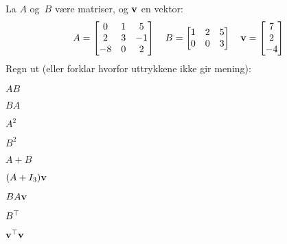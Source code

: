 
\begin{oppgave}
La $A$ og~$B$ være matriser, og $\mathbf{v}$ en vektor:
\[
A =
\begin{bmatrix}
 0 & 1 &  5 \\
 2 & 3 & -1 \\
-8 & 0 & 2
\end{bmatrix}
\quad
B =
\begin{bmatrix}
1 & 2 & 5 \\
0 & 0 & 3
\end{bmatrix}
\quad
\mathbf{v} = \begin{bmatrix} 7 \\ 2 \\ -4 \end{bmatrix}
\]
Regn ut (eller forklar hvorfor uttrykkene ikke gir mening):

\noindent
\begin{minipage}{0.14\textwidth}
\begin{punkt}
$AB$
\end{punkt}
\begin{punkt}
$BA$
\end{punkt}
\begin{punkt}
$A^2$
\end{punkt}
\end{minipage}
\begin{minipage}{0.19\textwidth}
\begin{punkt}
$B^2$
\end{punkt}
\begin{punkt}
$A+B$
\end{punkt}
\begin{punkt}
$(A + I_3) \mathbf{v}$
\end{punkt}
\end{minipage}
\begin{minipage}{0.1\textwidth}
\begin{punkt}
$BA\mathbf{v}$
\end{punkt}
\begin{punkt}
$B^\top$
\end{punkt}
\begin{punkt}
$\mathbf{v}^\top \mathbf{v}$
\end{punkt}
\end{minipage}
\end{oppgave}

